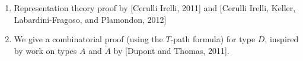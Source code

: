 \documentclass[a0paper, portrait, 17pt]{tikzposter}
\begin{document}
\begin{columns}
{%
\begin{enumerate}[-]
\item %
Representation theory proof by {[Cerulli Irelli, 2011]} and
{[Cerulli Irelli, Keller, Labardini-Fragoso, and Plamondon, 2012]}
\item We give a combinatorial proof (using the $T$-path formula) for type $D$,
inspired by work on types $A$ and $\widetilde{A}$ by {[Dupont and Thomas, 2011]}.

\end{enumerate}
}

\end{columns}

\end{document}

